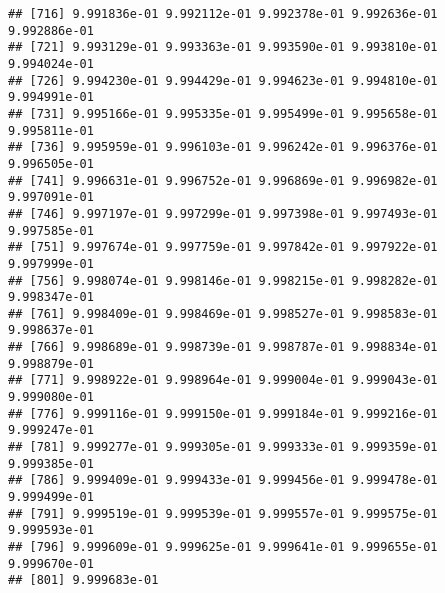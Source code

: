 \documentclass[
]{article}
\begin{document}
\begin{verbatim}
## [716] 9.991836e-01 9.992112e-01 9.992378e-01 9.992636e-01 9.992886e-01
## [721] 9.993129e-01 9.993363e-01 9.993590e-01 9.993810e-01 9.994024e-01
## [726] 9.994230e-01 9.994429e-01 9.994623e-01 9.994810e-01 9.994991e-01
## [731] 9.995166e-01 9.995335e-01 9.995499e-01 9.995658e-01 9.995811e-01
## [736] 9.995959e-01 9.996103e-01 9.996242e-01 9.996376e-01 9.996505e-01
## [741] 9.996631e-01 9.996752e-01 9.996869e-01 9.996982e-01 9.997091e-01
## [746] 9.997197e-01 9.997299e-01 9.997398e-01 9.997493e-01 9.997585e-01
## [751] 9.997674e-01 9.997759e-01 9.997842e-01 9.997922e-01 9.997999e-01
## [756] 9.998074e-01 9.998146e-01 9.998215e-01 9.998282e-01 9.998347e-01
## [761] 9.998409e-01 9.998469e-01 9.998527e-01 9.998583e-01 9.998637e-01
## [766] 9.998689e-01 9.998739e-01 9.998787e-01 9.998834e-01 9.998879e-01
## [771] 9.998922e-01 9.998964e-01 9.999004e-01 9.999043e-01 9.999080e-01
## [776] 9.999116e-01 9.999150e-01 9.999184e-01 9.999216e-01 9.999247e-01
## [781] 9.999277e-01 9.999305e-01 9.999333e-01 9.999359e-01 9.999385e-01
## [786] 9.999409e-01 9.999433e-01 9.999456e-01 9.999478e-01 9.999499e-01
## [791] 9.999519e-01 9.999539e-01 9.999557e-01 9.999575e-01 9.999593e-01
## [796] 9.999609e-01 9.999625e-01 9.999641e-01 9.999655e-01 9.999670e-01
## [801] 9.999683e-01
\end{verbatim}
\end{document}

